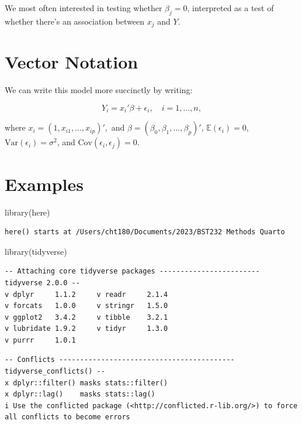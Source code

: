 \documentclass[
  letterpaper,
  DIV=11,
  numbers=noendperiod]{scrreport}
\newenvironment{Shaded}{\begin{snugshade}}{\end{snugshade}}
\newcommand{\FunctionTok}[1]{\textcolor[rgb]{0.28,0.35,0.67}{#1}}
\newcommand{\NormalTok}[1]{\textcolor[rgb]{0.00,0.23,0.31}{#1}}
\begin{document}
We most often interested in testing whether \(\beta_j = 0\), interpreted
as a test of whether there's an association between \(x_j\) and \(Y\).

\hypertarget{vector-notation}{%
\section{Vector Notation}\label{vector-notation}}

We can write this model more succinctly by writing:

\[ Y_i = x_i' \beta + \epsilon_i, \quad i = 1, ..., n,\]

where \(x_i = (1, x_{i1}, ..., x_{ip})',\) and
\(\beta = (\beta_0, \beta_1, ..., \beta_p)'\),
\(\mathbb E(\epsilon_i) = 0\), \(\text{Var}(\epsilon_i) = \sigma^2\),
and \(\text{Cov}(\epsilon_i, \epsilon_j) = 0\).

\hypertarget{examples}{%
\section{Examples}\label{examples}}

\begin{Shaded}
\begin{Highlighting}[]
\FunctionTok{library}\NormalTok{(here)}
\end{Highlighting}
\end{Shaded}

\begin{verbatim}
here() starts at /Users/cht180/Documents/2023/BST232 Methods Quarto
\end{verbatim}

\begin{Shaded}
\begin{Highlighting}[]
\FunctionTok{library}\NormalTok{(tidyverse)}
\end{Highlighting}
\end{Shaded}

\begin{verbatim}
-- Attaching core tidyverse packages ------------------------ tidyverse 2.0.0 --
v dplyr     1.1.2     v readr     2.1.4
v forcats   1.0.0     v stringr   1.5.0
v ggplot2   3.4.2     v tibble    3.2.1
v lubridate 1.9.2     v tidyr     1.3.0
v purrr     1.0.1     
\end{verbatim}

\begin{verbatim}
-- Conflicts ------------------------------------------ tidyverse_conflicts() --
x dplyr::filter() masks stats::filter()
x dplyr::lag()    masks stats::lag()
i Use the conflicted package (<http://conflicted.r-lib.org/>) to force all conflicts to become errors
\end{verbatim}
\end{document}

